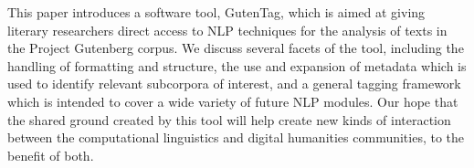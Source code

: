 This paper introduces a software tool, GutenTag, which is aimed at giving literary researchers direct access to NLP techniques for the analysis of texts in the Project Gutenberg corpus. We discuss several facets of the tool, including the handling of formatting and structure, the use and expansion of metadata which is used to identify relevant subcorpora of interest, and a general tagging framework which is intended to cover a wide variety of future NLP modules. Our hope that the shared ground created by this tool will help create new kinds of interaction between the computational linguistics and digital humanities communities, to the benefit of both.
